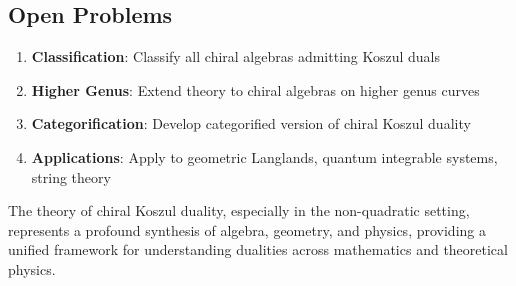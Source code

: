 \subsection{Open Problems}

\begin{enumerate}
\item \textbf{Classification}: Classify all chiral algebras admitting Koszul duals
\item \textbf{Higher Genus}: Extend theory to chiral algebras on higher genus curves
\item \textbf{Categorification}: Develop categorified version of chiral Koszul duality
\item \textbf{Applications}: Apply to geometric Langlands, quantum integrable systems, string theory
\end{enumerate}

The theory of chiral Koszul duality, especially in the non-quadratic setting, represents a profound synthesis of algebra, geometry, and physics, providing a unified framework for understanding dualities across mathematics and theoretical physics.